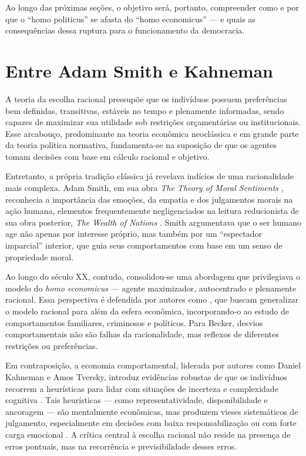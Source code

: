 Ao longo das próximas seções, o objetivo será, portanto, compreender como e por que o ``homo politicus'' se afasta do ``homo economicus'' — e quais as consequências dessa ruptura para o funcionamento da democracia.

\section{Entre Adam Smith e Kahneman} %

A teoria da escolha racional pressupõe que os indivíduos possuem preferências bem definidas, transitivas, estáveis no tempo e plenamente informadas, sendo capazes de maximizar sua utilidade sob restrições orçamentárias ou institucionais. Esse arcabouço, predominante na teoria econômica neoclássica e em grande parte da teoria política normativa, fundamenta-se na suposição de que os agentes tomam decisões com base em cálculo racional e objetivo.

Entretanto, a própria tradição clássica já revelava indícios de uma racionalidade mais complexa. Adam Smith, em sua obra \textit{The Theory of Moral Sentiments} \cite{smith1759-theory-of-moral-sentiments}, reconhecia a importância das emoções, da empatia e dos julgamentos morais na ação humana, elementos frequentemente negligenciados na leitura reducionista de sua obra posterior, \textit{The Wealth of Nations} \cite{smith1776inquiry}. Smith argumentava que o ser humano age não apenas por interesse próprio, mas também por um ``espectador imparcial'' interior, que guia seus comportamentos com base em um senso de propriedade moral.

Ao longo do século XX, contudo, consolidou-se uma abordagem que privilegiava o modelo do \textit{homo economicus} — agente maximizador, autocentrado e plenamente racional. Essa perspectiva é defendida por autores como , que buscam generalizar o modelo racional para além da esfera econômica, incorporando-o ao estudo de comportamentos familiares, criminosos e políticos. Para Becker, desvios comportamentais não são falhas da racionalidade, mas reflexos de diferentes restrições ou preferências.

Em contraposição, a economia comportamental, liderada por autores como Daniel Kahneman e Amos Tversky, introduz evidências robustas de que os indivíduos recorrem a heurísticas para lidar com situações de incerteza e complexidade cognitiva \cite{Judgment_under_Uncertainty}. Tais heurísticas — como representatividade, disponibilidade e ancoragem — são mentalmente econômicas, mas produzem vieses sistemáticos de julgamento, especialmente em decisões com baixa responsabilização ou com forte carga emocional \cite{kahneman2011thinking}. A crítica central à escolha racional não reside na presença de erros pontuais, mas na recorrência e previsibilidade desses erros.


